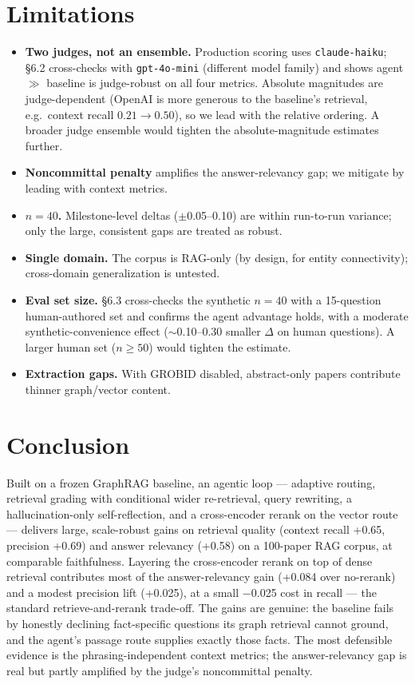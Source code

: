 \documentclass[11pt]{article}
\begin{document}
\section{Limitations}
\begin{itemize}
  \item \textbf{Two judges, not an ensemble.} Production scoring uses \texttt{claude-haiku}; \S6.2 cross-checks with \texttt{gpt-4o-mini} (different model family) and shows agent $\gg$ baseline is judge-robust on all four metrics. Absolute magnitudes are judge-dependent (OpenAI is more generous to the baseline's retrieval, e.g.\ context recall $0.21\to 0.50$), so we lead with the relative ordering. A broader judge ensemble would tighten the absolute-magnitude estimates further.
  \item \textbf{Noncommittal penalty} amplifies the answer-relevancy gap; we mitigate by leading with context metrics.
  \item \textbf{$n{=}40$.} Milestone-level deltas ($\pm$0.05--0.10) are within run-to-run variance; only the large, consistent gaps are treated as robust.
  \item \textbf{Single domain.} The corpus is RAG-only (by design, for entity connectivity); cross-domain generalization is untested.
  \item \textbf{Eval set size.} \S6.3 cross-checks the synthetic $n{=}40$ with a 15-question human-authored set and confirms the agent advantage holds, with a moderate synthetic-convenience effect ($\sim$0.10--0.30 smaller $\Delta$ on human questions). A larger human set ($n \geq 50$) would tighten the estimate.
  \item \textbf{Extraction gaps.} With GROBID disabled, abstract-only papers contribute thinner graph/vector content.
\end{itemize}

\section{Conclusion}
Built on a frozen GraphRAG baseline, an agentic loop --- adaptive routing, retrieval grading with conditional wider re-retrieval, query rewriting, a hallucination-only self-reflection, and a cross-encoder rerank on the vector route --- delivers large, scale-robust gains on retrieval quality (context recall +0.65, precision +0.69) and answer relevancy (+0.58) on a 100-paper RAG corpus, at comparable faithfulness. Layering the cross-encoder rerank on top of dense retrieval contributes most of the answer-relevancy gain (+0.084 over no-rerank) and a modest precision lift (+0.025), at a small $-$0.025 cost in recall --- the standard retrieve-and-rerank trade-off. The gains are genuine: the baseline fails by honestly declining fact-specific questions its graph retrieval cannot ground, and the agent's passage route supplies exactly those facts. The most defensible evidence is the phrasing-independent context metrics; the answer-relevancy gap is real but partly amplified by the judge's noncommittal penalty.
\end{document}
